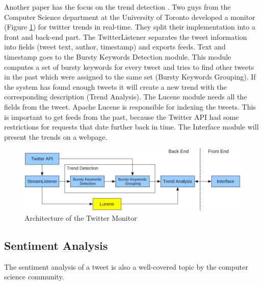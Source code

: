 \documentclass[a4paper]{article}
\begin{document}
Another paper has the focus on the trend detection \cite{monitorTwitterTrends}. Two guys from the Computer Science department at the University of Toronto developed a monitor (Figure \ref{monitorArchitecture}) for twitter trends in real-time. They split their implementation into a front and back-end part. The TwitterListener separates the tweet information into fields (tweet text, author, timestamp) and exports feeds. Text and timestamp goes to the Bursty Keywords Detection module. This module computes a set of bursty keywords for every tweet and tries to find other tweets in the past which were assigned to the same set (Bursty Keywords Grouping). If the system has found enough tweets it will create a new trend with the corresponding description (Trend Analysis). The Lucene module needs all the fields from the tweet. Apache Lucene is responsible for indexing the tweets. This is important to get feeds from the past, because the Twitter API had some restrictions for requests that date further back in time. The Interface module will present the trends on a webpage.
\begin{figure}[h!]
	\centering
	\includegraphics[scale=0.45]{images/monitorArchitecture.png}
	\caption{Architecture of the Twitter Monitor}
	\label{monitorArchitecture}
\end{figure}

\subsection{Sentiment Analysis}
The sentiment analysis of a tweet is also a well-covered topic by the computer science community.\\ 
\end{document}
